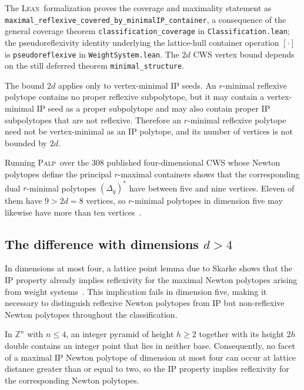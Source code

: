 \documentclass[appliedmath,article,submit,moreauthors]{Definitions/mdpi}
\newcommand{\Z}{\mathbb{Z}}
\newcommand{\Lean}{\textsc{Lean}}
\newcommand{\PALP}{\textsc{Palp}}
\newcommand{\Dq}{\Delta_q}
\begin{document}
The \Lean\ formalization proves the coverage and maximality statement as
\nolinkurl{maximal\_reflexive\_covered\_by\_minimalIP\_container}, a consequence
of the general coverage theorem \nolinkurl{classification\_coverage} in
\nolinkurl{Classification.lean}; the pseudoreflexivity identity underlying the
lattice-hull container operation \([\cdot]\) is \nolinkurl{pseudoreflexive} in
\nolinkurl{WeightSystem.lean}. The \(2d\) CWS vertex bound depends on the still
deferred theorem \nolinkurl{minimal\_structure}.

\begin{Remark}
\label{rmk:rmin-vs-vmin}
The bound \(2d\) applies only to vertex-minimal IP seeds. An \(r\)-minimal
reflexive polytope contains no proper reflexive subpolytope, but it may contain
a vertex-minimal IP seed as a proper subpolytope and may also contain proper IP
subpolytopes that are not reflexive. Therefore an \(r\)-minimal reflexive
polytope need not be vertex-minimal as an IP polytope, and its number of
vertices is not bounded by \(2d\).

Running \PALP\ over the \(308\) published four-dimensional CWS whose Newton
polytopes define the principal \(r\)-maximal containers shows that the
corresponding dual \(r\)-minimal polytopes \((\Dq)^*\) have between five and
nine vertices. Eleven of them have \(9>2d=8\) vertices, so \(r\)-minimal
polytopes in dimension five may likewise have more than ten
vertices~\cite{KreuzerSkarke2000,KSFibrations2002,PALP}.
\end{Remark}



\subsection{The difference with dimensions $d > 4$}
\label{sec:math-watershed}

In dimensions at most four, a lattice point lemma due to Skarke shows that the
IP property already implies reflexivity for the maximal Newton polytopes arising
from weight systems~\cite{Skarke1996}. This implication fails in dimension five,
making it necessary to distinguish reflexive Newton polytopes from IP but
non-reflexive Newton polytopes throughout the classification.

\begin{Theorem}
\label{thm:pyramid}
In \(\Z^n\) with \(n\leq4\), an integer pyramid of height \(h\geq2\) together
with its height \(2h\) double contains an integer point that lies in neither
base. Consequently, no facet of a maximal IP Newton polytope of dimension at
most four can occur at lattice distance greater than or equal to two, so the IP
property implies reflexivity for the corresponding Newton polytopes.
\end{Theorem}
\end{document}
